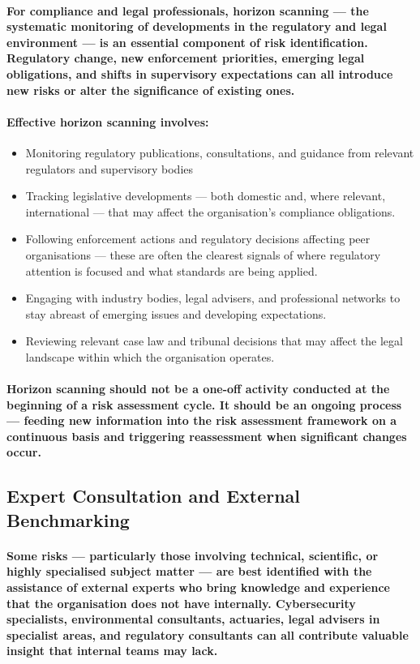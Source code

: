 \paragraph{For compliance and legal professionals, horizon scanning — the systematic monitoring of developments in the regulatory and legal environment — is an essential component of risk identification. Regulatory change, new enforcement priorities, emerging legal obligations, and shifts in supervisory expectations can all introduce new risks or alter the significance of existing ones.}
\paragraph{Effective horizon scanning involves:}
\begin{itemize}
    \item{Monitoring regulatory publications, consultations, and guidance from relevant regulators and supervisory bodies}
    \item{Tracking legislative developments — both domestic and, where relevant, international — that may affect the organisation's compliance obligations.}
    \item{Following enforcement actions and regulatory decisions affecting peer organisations — these are often the clearest signals of where regulatory attention is focused and what standards are being applied.}
    \item{Engaging with industry bodies, legal advisers, and professional networks to stay abreast of emerging issues and developing expectations.}
    \item{Reviewing relevant case law and tribunal decisions that may affect the legal landscape within which the organisation operates.}
\end{itemize}
\paragraph{Horizon scanning should not be a one-off activity conducted at the beginning of a risk assessment cycle. It should be an ongoing process — feeding new information into the risk assessment framework on a continuous basis and triggering reassessment when significant changes occur.}

\subsection{Expert Consultation and External Benchmarking}
\paragraph{Some risks — particularly those involving technical, scientific, or highly specialised subject matter — are best identified with the assistance of external experts who bring knowledge and experience that the organisation does not have internally. Cybersecurity specialists, environmental consultants, actuaries, legal advisers in specialist areas, and regulatory consultants can all contribute valuable insight that internal teams may lack.}
